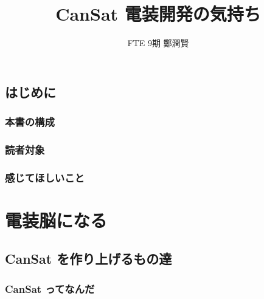 \documentclass[dvipdfmx]{jsbook}
\begin{document}
\title{CanSat 電装開発の気持ち}
\author{FTE 9期 \quad 鄭潤賢}
\date{}         %
\maketitle

\tableofcontents
\clearpage


\chapter{はじめに}

\section{本書の構成}

\section{読者対象}

\section{感じてほしいこと}


\clearpage

\part{電装脳になる}


\chapter{CanSat を作り上げるもの達}


\section{CanSat ってなんだ}
\label{sec:CanSatってなんだ}
\end{document}
